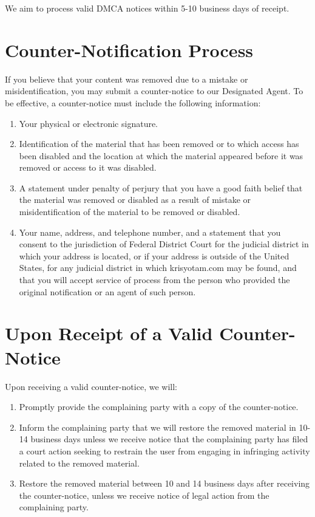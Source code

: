 \documentclass[11pt]{article}
\begin{document}
We aim to process valid DMCA notices within 5-10 business days of receipt.

\section{Counter-Notification Process}
If you believe that your content was removed due to a mistake or misidentification, you may submit a counter-notice to our Designated Agent. To be effective, a counter-notice must include the following information:

\begin{enumerate}
  \item Your physical or electronic signature.
  
  \item Identification of the material that has been removed or to which access has been disabled and the location at which the material appeared before it was removed or access to it was disabled.
  
  \item A statement under penalty of perjury that you have a good faith belief that the material was removed or disabled as a result of mistake or misidentification of the material to be removed or disabled.
  
  \item Your name, address, and telephone number, and a statement that you consent to the jurisdiction of Federal District Court for the judicial district in which your address is located, or if your address is outside of the United States, for any judicial district in which krisyotam.com may be found, and that you will accept service of process from the person who provided the original notification or an agent of such person.
\end{enumerate}

\section{Upon Receipt of a Valid Counter-Notice}
Upon receiving a valid counter-notice, we will:

\begin{enumerate}
  \item Promptly provide the complaining party with a copy of the counter-notice.
  
  \item Inform the complaining party that we will restore the removed material in 10-14 business days unless we receive notice that the complaining party has filed a court action seeking to restrain the user from engaging in infringing activity related to the removed material.
  
  \item Restore the removed material between 10 and 14 business days after receiving the counter-notice, unless we receive notice of legal action from the complaining party.
\end{enumerate}
\end{document}
